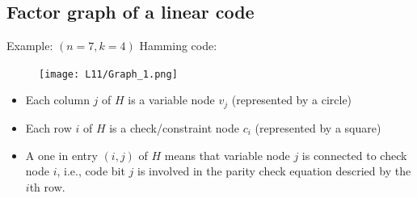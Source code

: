 \documentclass[12pt]{article}
\begin{document}
\subsection{Factor graph of a linear code}
Example: $(n=7,k=4)$ Hamming code:
\begin{figure}[H]
    \centering
    \texttt{[image: L11/Graph\_1.png]}
\end{figure}
\begin{itemize}
    \item Each column $j$ of $H$ is a variable node $v_j$ (represented by a circle)
    \item Each row $i$ of $H$ is a check/constraint node $c_i$ (represented by a square)
    \item A one in entry $(i,j)$ of $H$ means that variable node $j$ is connected to check node $i$, i.e., code bit $j$ is involved in the parity check equation descried by the $i$th row. 
\end{itemize}
\end{document}
